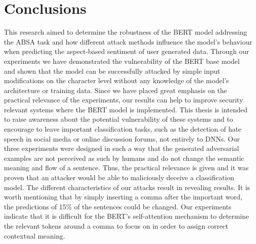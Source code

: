 \section{Conclusions}

This research aimed to determine the robustness of the BERT model addressing the ABSA task and how different attack methods influence the model's behaviour when predicting the aspect-based sentiment of user generated data. 
Through our experiments we have demonstrated the vulnerability of the BERT base model and shown that the model can be successfully attacked by simple input modifications on the character level without any knowledge of the model's architecture or training data. Since we have placed great emphasis on the practical relevance of the experiments, our results can help to improve security relevant systems where the BERT model is implemented. This thesis is intended to raise awareness about the potential vulnerability of these systems and to encourage to leave important classification tasks, such as the detection of hate speech in social media or online discussion forums, not entirely to DNNs. 
Our three experiments were designed in such a way that the generated adversarial examples are not perceived as such by humans and do not change the semantic meaning and flow of a sentence. Thus, the practical relevance is given and it was proven that an attacker would be able to maliciously deceive a classification model. 
The different characteristics of our attacks result in revealing results. It is worth mentioning that by simply inserting a comma after the important word, the predictions of 15\% of the sentences could be changed. Our experiments indicate that it is difficult for the BERT's self-attention mechanism to determine the relevant tokens around a comma to focus on in order to assign correct contextual meaning. 





